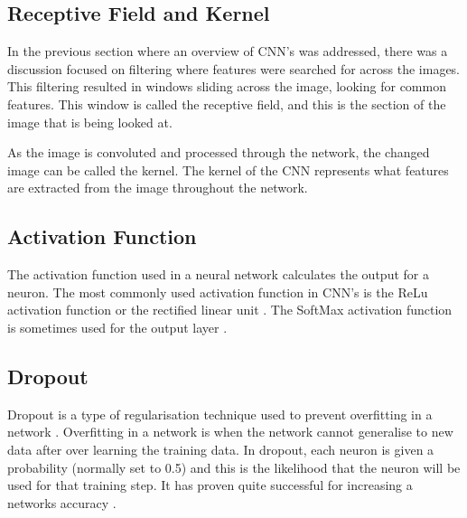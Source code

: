 
\tocless\subsection{Receptive Field and Kernel}
In the previous section where an overview of CNN's was addressed, there was a discussion focused on filtering where features were searched for across the images.
This filtering resulted in windows sliding across the image, looking for common features.
This window is called the receptive field, and this is the section of the image that is being looked at.

As the image is convoluted and processed through the network, the changed image can be called the kernel.
The kernel of the CNN represents what features are extracted from the image throughout the network.

\tocless\subsection{Activation Function}
The activation function used in a neural network calculates the output for a neuron.
The most commonly used activation function in CNN's is the ReLu activation function or the rectified linear unit \parencite{handsOnML}.
The SoftMax activation function is sometimes used for the output layer \parencite{handsOnML}.

\tocless\subsection{Dropout}
Dropout is a type of regularisation technique used to prevent overfitting in a network \parencite{handsOnML}.
Overfitting in a network is when the network cannot generalise to new data after over learning the training data.
In dropout, each neuron is given a probability (normally set to 0.5) and this is the likelihood that the neuron will be used for that training step.
It has proven quite successful for increasing a networks accuracy \parencite{handsOnML}.

